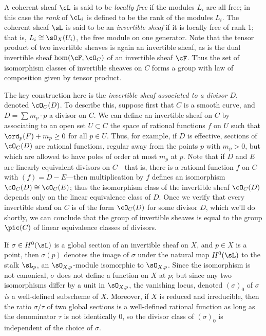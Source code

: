 A coherent sheaf $\cL$ is said to be \emph{locally free} if the modules $L_i$ are all free; in this case the \emph{rank} of $\cL_i$ is defined to be the rank of the modules $L_i$.
The coherent sheaf $\sL$ is said to be an \emph{invertible sheaf} if it is locally free of rank 1; that is, $L_{i} \cong \sO_X(U_{i})$, the free module on one generator. Note that the tensor product of two invertible sheaves is  again an invertible sheaf, as is the dual invertible sheaf $\hom(\cF, \cO_C)$ of an invertible sheaf $\cF$. Thus the set of isomorphism classes of invertible sheaves on $C$ forms a group with law of composition given by tensor product.

The key construction here is the \emph{invertible sheaf associated to a divisor} $D$, denoted $\cO_C(D)$. To describe this, suppose first that $C$ is a smooth curve, and $D = \sum m_p\cdot p$ a divisor on $C$. We can define an invertible sheaf on $C$ by associating to an open set $U \subset C$ the space of rational functions $f$ on $U$ such that $\ord_p(F) + m_p \geq 0$ for all $p \in U$. Thus, for example, if $D$ is effective, sections of $\cO_C(D)$ are rational functions, regular away from the points $p$ with $m_p > 0$, but which are allowed to have poles of order at most $m_p$ at $p$. Note that if $D$ and $E$ are linearly equivalent divisors on $C$---that is, there is a rational function $f$ on $C$ with $(f) = D - E$---then multiplication by $f$ defines an isomorphism $\cO_C(D) \cong \cO_C(E)$; thus the isomorphism class of the invertible sheaf $\cO_C(D)$ depends only on the linear equivalence class of $D$. Once we verify that every invertible sheaf on $C$ is of the form $\cO_C(D)$ for some divisor $D$, which we'll do shortly, we can conclude that the group of invertible sheaves is equal to the group $\pic(C)$ of linear equivalence classes of divisors. 

If $\sigma \in H^0(\sL)$ is a global section of an invertible sheaf
on $X$, and $p\in X$ is a point, then $\sigma(p)$ denotes the image of $\sigma$ under the natural map $H^0(\sL)$ to the stalk $\sL_{p}$, an $\sO_{X,p}$-module isomorphic to $\sO_{X,p}$. Since the isomorphism is not canonical, $\sigma$ does not define a function on $X$ at $p$; but since any two isomorphisms
differ by a unit in $\sO_{X,p}$, the vanishing locus, denoted $(\sigma)_0$ of $\sigma$ \emph{is} a well-defined subscheme of $X$. Moreover, if $X$ is reduced and irreducible, then the ratio $\sigma/\tau$ of two global sections is a well-defined rational function as long as the denominator $\tau$ is not identically 0, so the divisor class of 
$(\sigma)_0$ is independent of the choice of $\sigma$.

